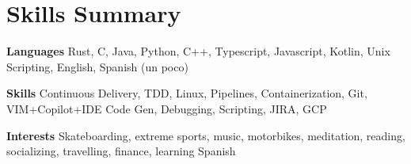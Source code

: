 \documentclass[letterpaper,oneside,10.8pt]{article}
\makeatletter
\newcommand{\titleAndDate}[2]{
  \small{
  \vspace{-1pt}
    \begin{tabular*}{1\textwidth}{l@{\extracolsep{\fill}}r}
      \textbf{#1} & \textbf{#2} \\
    \end{tabular*}\vspace{-1pt} \\
  }
}
\newcommand{\normalText}[1]{
  \small{
    {#1}
  }\vspace{-1pt}\\
}
\makeatother
\begin{document}
   




\section{Skills Summary}

\normalText{\textbf{Languages} Rust, C, Java, Python, C++, Typescript, Javascript, Kotlin, Unix Scripting, English, Spanish (un poco)}
\vspace{3pt}
\normalText{\textbf{Skills} Continuous Delivery, TDD, Linux, Pipelines, Containerization, Git, VIM+Copilot+IDE Code Gen, Debugging, Scripting, JIRA, GCP}
\vspace{3pt}
\normalText{\textbf{Interests} Skateboarding, extreme sports, music, 
 motorbikes, meditation, reading, socializing, travelling, finance, learning Spanish}

\end{document}
